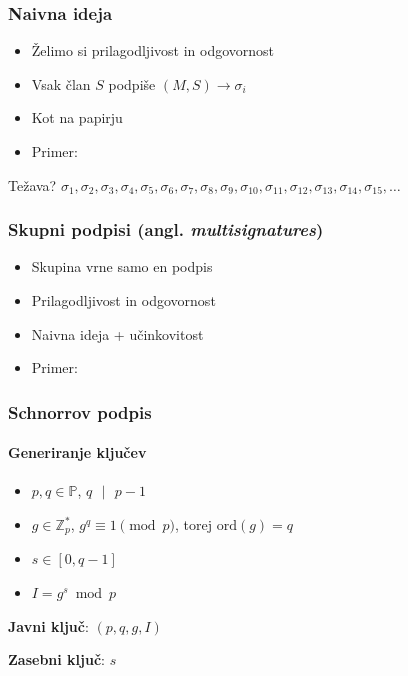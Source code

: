 \documentclass{beamer}    %
\begin{document}
\begin{frame}
    \frametitle{Naivna ideja}
    \begin{itemize}
        \item Želimo si prilagodljivost in odgovornost
        \item Vsak član $S$ podpiše $(M, S) \rightarrow \sigma_i$
        \item Kot na papirju
        \item Primer: 
    \end{itemize}
    \vspace{1cm}
    \pause
    Težava?
        $\sigma_1, \sigma_2, \sigma_3, \sigma_4, \sigma_5, \sigma_6,
        \sigma_7,  \sigma_8, \sigma_9, \sigma_{10}, \sigma_{11}, \sigma_{12}, 
        \sigma_{13}, \sigma_{14}, \sigma_{15}, \dots$
\end{frame}

\begin{frame}
    \frametitle{Skupni podpisi (angl. \textit{multisignatures})}
    \begin{itemize}
        \item Skupina vrne samo en podpis
        \item Prilagodljivost in odgovornost
        \item Naivna ideja + učinkovitost
        \item Primer:
    \end{itemize}
\end{frame}

\begin{frame}
    \frametitle{Schnorrov podpis}
    \framesubtitle{Generiranje ključev}
    \begin{itemize}
        \item $p, q \in \mathbb{P}$, $q\text{ }|\text{ }p-1$
        \item $g \in \mathbb{Z}_p^*$, $g^q \equiv 1 \pmod{p}$, torej $\text{ord}(g) = q$
        \item $s \in [0, q-1]$
        \item $I = g^s \bmod{p}$
    \end{itemize}
    \vspace{1cm}
    \begin{multicols*}{2}
        \textbf{Javni ključ}: $(p, q, g, I)$
        \columnbreak

        \textbf{Zasebni ključ}: $s$
    \end{multicols*}
\end{frame}
\end{document}
